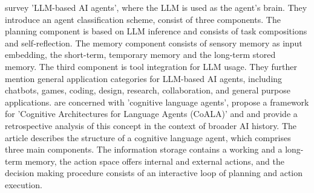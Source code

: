 \documentclass{article}
\begin{document}
\cite{zhao_-depth_2023} survey 'LLM-based AI agents', where the LLM is used as the agent's brain. They introduce an agent classification scheme, consist of three components. The planning component is based on LLM inference and consists of task compositions and self-reflection. The memory component consists of sensory memory as input embedding, the short-term, temporary memory and the long-term stored memory. The third component is tool integration for LLM usage. They further mention general application categories for LLM-based AI agents, including chatbots, games, coding, design, research, collaboration, and general purpose applications. 
\cite{sumers_cognitive_2023} are concerned with 'cognitive language agents', propose a framework for 'Cognitive Architectures for Language Agents (CoALA)' and and provide a retrospective analysis of this concept in the context of broader AI history. The article describes the structure of a cognitive language agent, which comprises three main components. The information storage contains a working and a long-term memory, the action space
offers internal and external actions, and  the decision making procedure consists of an interactive loop of planning and action execution.

\end{document}
